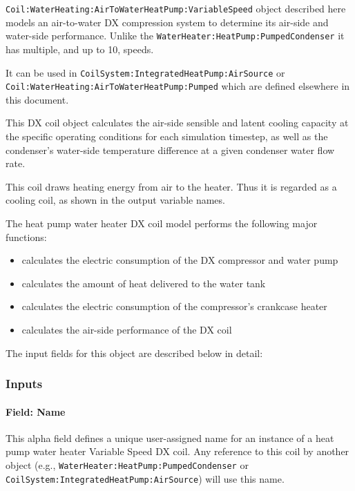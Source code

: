 \lstinline!Coil:WaterHeating:AirToWaterHeatPump:VariableSpeed! object described here models an air-to-water DX compression system to determine its air-side and water-side performance.
Unlike the \lstinline!WaterHeater:HeatPump:PumpedCondenser! it has multiple, and up to 10, speeds.

It can be used in \lstinline!CoilSystem:IntegratedHeatPump:AirSource! or \lstinline!Coil:WaterHeating:AirToWaterHeatPump:Pumped! which are defined elsewhere in this document.

This DX coil object calculates the air-side sensible and latent cooling capacity at the specific operating conditions for each simulation timestep, as well as the condenser's water-side temperature difference at a given condenser water flow rate.

This coil draws heating energy from air to the heater. Thus it is regarded as a cooling coil, as shown in the output variable names.

The heat pump water heater DX coil model performs the following major functions:

\begin{itemize}
\item
  calculates the electric consumption of the DX compressor and water pump
\item
  calculates the amount of heat delivered to the water tank
\item
  calculates the electric consumption of the compressor's crankcase heater
\item
  calculates the air-side performance of the DX coil
\end{itemize}

The input fields for this object are described below in detail:

\subsubsection{Inputs}

\paragraph{Field: Name}\label{vshpwhheating-name}

This alpha field defines a unique user-assigned name for an instance of a heat pump water heater Variable Speed DX coil.
Any reference to this coil by another object (e.g., \lstinline!WaterHeater:HeatPump:PumpedCondenser! or \lstinline!CoilSystem:IntegratedHeatPump:AirSource!) will use this name.

